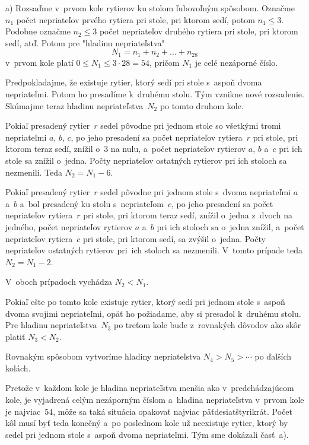 {%
a)
Rozsaďme v~prvom kole rytierov ku stolom
ľubovoľným spôsobom. Označme $n_1$ počet nepriateľov prvého rytiera
pri stole, pri ktorom sedí, potom $n_1\leq3$. Podobne označme
$n_2\leq3$ počet nepriateľov druhého rytiera pri stole, pri ktorom
sedí, atď. Potom pre "hladinu nepriateľstva"
$$
N_1=n_1+n_2+\dots+n_{28}
$$
v~prvom kole platí $0\leq N_1\leq 3\cdot 28=54$, pričom $N_1$ je
celé nezáporné číslo.

Predpokladajme, že existuje rytier, ktorý sedí pri stole s~aspoň
dvoma nepriateľmi. Potom ho presadíme k~druhému stolu. Tým vznikne
nové rozsadenie. Skúmajme teraz hladinu nepriateľstva~$N_2$ po
tomto druhom kole.

Pokiaľ presadený rytier~$r$ sedel pôvodne pri jednom stole so všetkými
tromi nepriateľmi $a$, $b$, $c$, po jeho presadení sa počet nepriateľov
rytiera~$r$ pri stole, pri ktorom teraz sedí, znížil o~$3$ na nulu, a~počet
nepriateľov rytierov $a$, $b$ a~$c$ pri ich stole sa znížil o~jedna.
Počty nepriateľov ostatných rytierov pri ich stoloch sa nezmenili.
Teda $N_2=N_1-6$.

Pokiaľ presadený rytier~$r$ sedel pôvodne pri jednom stole s~dvoma
nepriateľmi $a$ a~$b$ a~bol presadený ku stolu s~nepriateľom~$c$, po
jeho presadení sa počet nepriateľov rytiera~$r$ pri stole, pri ktorom
teraz sedí, znížil o~jedna z~dvoch na jedného, počet nepriateľov rytierov
$a$ a~$b$ pri ich stoloch sa o~jedna znížil, a~počet nepriateľov
rytiera~$c$ pri stole, pri ktorom sedí, sa zvýšil o~jedna. Počty nepriateľov
ostatných rytierov pri~ich stoloch sa nezmenili. V~tomto
prípade teda $N_2=N_1-2$.

V~oboch prípadoch vychádza $N_2<N_1$.

Pokiaľ ešte po tomto kole existuje rytier, ktorý sedí pri jednom
stole s~aspoň dvoma svojimi nepriateľmi, opäť ho požiadame, aby si
presadol k~druhému stolu. Pre hladinu nepriateľstva~$N_3$ po treťom
kole bude z~rovnakých dôvodov ako skôr platiť $N_3<N_2$.

Rovnakým spôsobom vytvoríme hladiny nepriateľstva $N_4>N_5>\cdots$
po ďalších kolách.

Pretože v~každom kole je hladina nepriateľstva menšia ako
v~predchádzajúcom kole, je vyjadrená celým nezáporným číslom a~hladina
nepriateľstva v~prvom kole je najviac~$54$, môže sa taká situácia
opakovať najviac päťdesiatštyrikrát. Počet kôl musí byť teda
konečný a~po poslednom kole už neexistuje rytier, ktorý by sedel
pri jednom stole s~aspoň dvoma nepriateľmi. Tým sme dokázali
časť~a).

}
